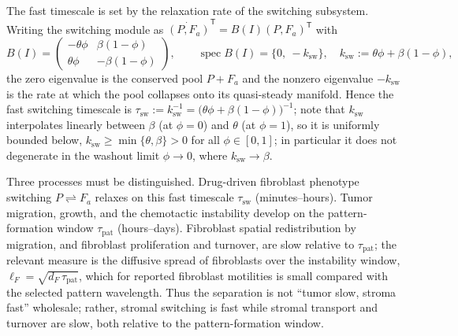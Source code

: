 \documentclass[pdflatex,sn-mathphys-ay]{sn-jnl}
\theoremstyle{thmstyleone}
\theoremstyle{definition}
\theoremstyle{remark}
\begin{document}
The fast timescale is set by the relaxation rate of the switching subsystem.
Writing the switching module as $\dot{(P,F_a)}^{\mathsf T}=B(I)(P,F_a)^{\mathsf T}$ with
\[
B(I)=\begin{pmatrix}-\theta\phi & \beta(1-\phi)\\ \theta\phi & -\beta(1-\phi)\end{pmatrix},
\qquad
\operatorname{spec}B(I)=\{0,\ -k_{\mathrm{sw}}\},\quad
k_{\mathrm{sw}}:=\theta\phi+\beta(1-\phi),
\]
the zero eigenvalue is the conserved pool $P+F_a$ and the nonzero eigenvalue
$-k_{\mathrm{sw}}$ is the rate at which the pool collapses onto its
quasi-steady manifold. Hence the fast switching timescale is
$\tau_{\mathrm{sw}}:=k_{\mathrm{sw}}^{-1}=\bigl(\theta\phi+\beta(1-\phi)\bigr)^{-1}$;
note that $k_{\mathrm{sw}}$ interpolates linearly between $\beta$ (at $\phi=0$) and
$\theta$ (at $\phi=1$), so it is uniformly bounded below,
$k_{\mathrm{sw}}\ge\min\{\theta,\beta\}>0$ for all $\phi\in[0,1]$; in particular it
does not degenerate in the washout limit $\phi\to0$, where $k_{\mathrm{sw}}\to\beta$.

Three processes must be distinguished. Drug-driven fibroblast phenotype
switching $P\rightleftharpoons F_a$ relaxes on this fast timescale
$\tau_{\mathrm{sw}}$ (minutes--hours). Tumor migration, growth, and the chemotactic
instability develop on the pattern-formation window $\tau_{\mathrm{pat}}$
(hours--days). Fibroblast spatial redistribution by migration, and
fibroblast proliferation and turnover, are slow relative to $\tau_{\mathrm{pat}}$;
the relevant measure is the diffusive spread of fibroblasts over the instability
window, $\ell_F=\sqrt{d_F\,\tau_{\mathrm{pat}}}$, which for reported fibroblast
motilities is small compared with the selected pattern wavelength. Thus the
separation is not ``tumor slow, stroma fast'' wholesale; rather, stromal switching is fast while stromal transport and turnover are slow, both relative to the pattern-formation window.
\end{document}
